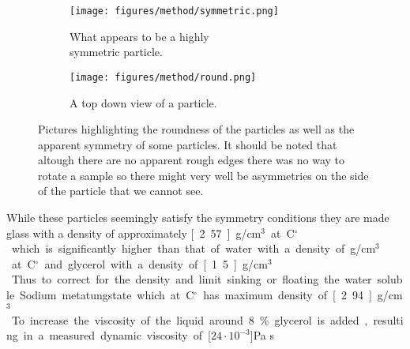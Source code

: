 \begin{figure}[H]
\centering
\begin{subfigure}[3a]{0.40\textwidth}
\texttt{[image: figures/method/symmetric.png]}
\caption{What appears to be a highly \\ symmetric particle.}\label{fig:symmetricparticle}
\end{subfigure}\hspace{1em}%
\begin{subfigure}[3b]{0.40\textwidth}
\texttt{[image: figures/method/round.png]}
\caption{A top down view of a particle.}\label{fig:roundparticle}
\end{subfigure}
\caption{Pictures highlighting the roundness of the particles as well as the apparent symmetry of some particles. It should be noted that altough there are no apparent rough edges there was no way to rotate a sample so there might very well be asymmetries on the side of the particle that we cannot see.}
\label{fig:particlepictures2}
\end{figure}

While these particles seemingly satisfy the symmetry conditions they are made glass with a density of approximately \unit[2.57]{g/cm$^3$} at \unit[20]{C$^\circ$} which is significantly higher than that of water with a density of \unit[1]{g/cm$^3$} at \unit[20]{C$^\circ$} and glycerol with a density of \unit[1.5]{g/cm$^3$}. Thus to correct for the density and limit sinking or floating the water soluble Sodium metatungstate which at \unit[20]{C$^\circ$} has maximum density of \unit[2.94]{g/cm$^3$}. To increase the viscosity of the liquid around 8\% glycerol is added, resulting in a measured dynamic viscosity of \unit[$24\cdot 10^{-3}$]{Pa s}
